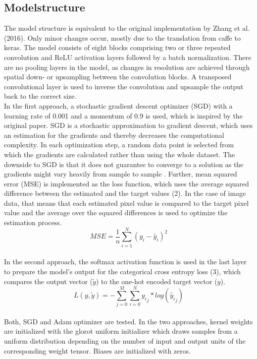 \documentclass[12pt,letterpaper]{article}
\begin{document}
\subsection{Modelstructure}
The model structure is equivalent to the original implementation by Zhang et al. (2016). Only minor changes occur, mostly due to the translation from caffe to keras. The model consists of eight blocks comprising two or three repeated convolution and ReLU activation layers followed by a batch normalization. There are no pooling layers in the model, as changes  in  resolution  are  achieved  through  spatial  down-  or  upsampling between the convolution blocks. A transposed convolutional layer is used to inverse the convolution and upsample the output back to the correct size.\\
In the first approach, a stochastic gradient descent optimizer (SGD) with a learning rate of 0.001 and a momentum of 0.9 is used, which is inspired by the original paper. SGD is a stochastic approximation to gradient descent, which uses an estimation for the gradients and thereby decreases the computational complexity. In each optimization step, a random data point is selected from which the gradients are calculated rather than using the whole dataset. The downside to SGD is that it does not guarantee to converge to a solution as the gradients might vary heavily from sample to sample \citep{Lecture.2019}. Further,  mean squared error (MSE) is implemented as the loss function, which uses the average squared difference between the estimated and the target values (2). In the case of image data, that means that each estimated pixel value is compared to the target pixel value and the average over the squared differences is used to optimize the estimation process.
\begin{equation}
MSE = \frac{1}{n}\sum_{i=1}^N(y_i - \tilde{y_i})^2
\end{equation}
\\
In the second approach, the softmax activation function is used in the last layer to prepare the model’s output for the categorical cross entropy loss (3), which compares the output vector ($\tilde{y}$) to the one-hot encoded target vector ($y$).
\begin{equation}
L(y,\tilde{y}) = -\sum_{j=0}^M \sum_{i=0}^N
{{y_i}_j}*log({\tilde{y_i}_j})
\end{equation}
\\
Both, SGD and Adam optimizer are tested. In the two approaches, kernel weights are initialized with the glorot uniform initializer which draws samples from a uniform distribution depending on the number of input and output units of the corresponding weight tensor. Biases are initialized with zeros.
\end{document}
